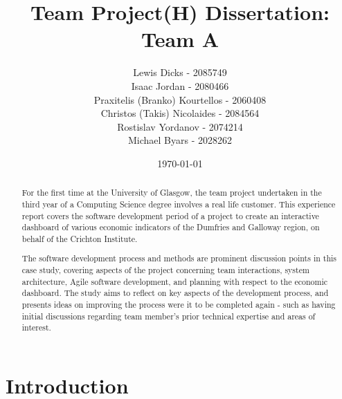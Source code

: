 \documentclass{l3proj}
\begin{document}
\title{Team Project(H) Dissertation: Team A}

\author{Lewis Dicks - 2085749 \\
        Isaac Jordan - 2080466 \\
        Praxitelis (Branko) Kourtellos - 2060408 \\
        Christos (Takis) Nicolaides - 2084564  \\
        Rostislav Yordanov - 2074214 \\
        Michael Byars - 2028262}

\date{\today}

\maketitle

\begin{abstract}

For the first time at the University of Glasgow, the team project undertaken in the third year of a Computing Science degree involves a real life customer. This experience report covers the software development period of a project to create an interactive dashboard of various economic indicators of the Dumfries and Galloway region, on behalf of the Crichton Institute.

The software development process and methods are prominent discussion points in this case study, covering aspects of the project concerning team interactions, system architecture, Agile software development, and planning with respect to the economic dashboard. The study aims to reflect on key aspects of the development process, and presents ideas on improving the process were it to be completed again - such as having initial discussions regarding team member's prior technical expertise and areas of interest.

\end{abstract}

\educationalconsent

\newpage

\section{Introduction}
\label{sec:introduction}
\end{document}
